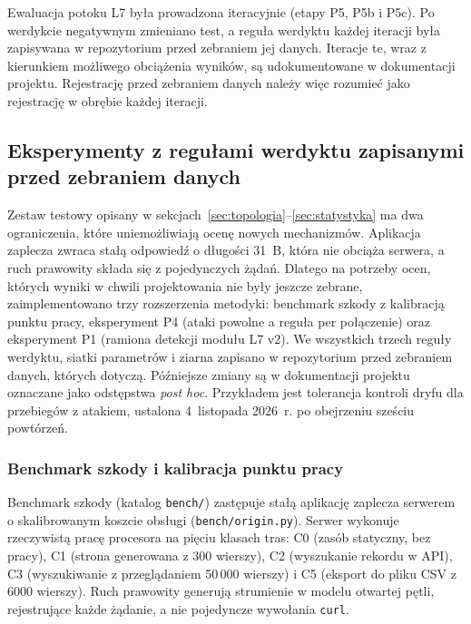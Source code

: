 \documentclass[a4paper,12pt]{article}
\begin{document}
Ewaluacja potoku L7 była prowadzona iteracyjnie (etapy P5, P5b i P5c). Po werdykcie negatywnym zmieniano test, a reguła werdyktu każdej iteracji była zapisywana w repozytorium przed zebraniem jej danych. Iteracje te, wraz z kierunkiem możliwego obciążenia wyników, są udokumentowane w dokumentacji projektu. Rejestrację przed zebraniem danych należy więc rozumieć jako rejestrację w obrębie każdej iteracji.

\subsection{Eksperymenty z regułami werdyktu zapisanymi przed zebraniem danych}\label{sec:eksperymenty_prereg}
Zestaw testowy opisany w sekcjach~\ref{sec:topologia}--\ref{sec:statystyka} ma dwa ograniczenia, które uniemożliwiają ocenę nowych mechanizmów. Aplikacja zaplecza zwraca stałą odpowiedź o długości 31~B, która nie obciąża serwera, a ruch prawowity składa się z pojedynczych żądań. Dlatego na potrzeby ocen, których wyniki w chwili projektowania nie były jeszcze zebrane, zaimplementowano trzy rozszerzenia metodyki: benchmark szkody z kalibracją punktu pracy, eksperyment P4 (ataki powolne a reguła per połączenie) oraz eksperyment P1 (ramiona detekcji modułu L7 v2). We wszystkich trzech reguły werdyktu, siatki parametrów i ziarna zapisano w repozytorium przed zebraniem danych, których dotyczą. Późniejsze zmiany są w dokumentacji projektu oznaczane jako odstępstwa \textit{post hoc}. Przykładem jest tolerancja kontroli dryfu dla przebiegów z atakiem, ustalona 4~listopada 2026~r. po obejrzeniu sześciu powtórzeń.

\subsubsection{Benchmark szkody i kalibracja punktu pracy}\label{sec:benchmark_szkody}
Benchmark szkody (katalog \texttt{bench/}) zastępuje stałą aplikację zaplecza serwerem o skalibrowanym koszcie obsługi (\texttt{bench/origin.py}). Serwer wykonuje rzeczywistą pracę procesora na pięciu klasach tras: C0 (zasób statyczny, bez pracy), C1 (strona generowana z 300 wierszy), C2 (wyszukanie rekordu w API), C3 (wyszukiwanie z przeglądaniem 50\,000 wierszy) i C5 (eksport do pliku CSV z 6000 wierszy). Ruch prawowity generują strumienie w modelu otwartej pętli, rejestrujące każde żądanie, a nie pojedyncze wywołania \texttt{curl}.
\end{document}
